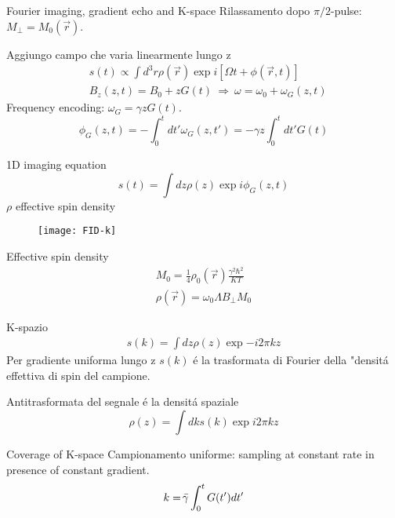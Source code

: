 \begin{frame}[allowframebreaks]{Fourier imaging, gradient echo and K-space}
Rilassamento dopo $\pi/2$-pulse:$M_{\perp}=M_0(\vec{r})$.
\begin{block}{Aggiungo campo che varia linearmente lungo z}
\begin{align*}
&s(t)\propto\int d^3 r\rho(\vec{r})\exp{i[\Omega t+\phi(\vec{r},t)]}\\
&B_z(z,t)=B_0+zG(t)\ \Rightarrow\ \omega=\omega_0+\omega_G(z,t)
\end{align*}
Frequency encoding: $\omega_G=\gamma zG(t)$.
\begin{equation*}
\phi_G(z,t)=-\int_0^td t'\omega_G(z,t')=-\gamma z\int_0^td t'G(t)
\end{equation*}
\end{block}
\begin{block}{1D imaging equation}
\begin{equation*}
s(t)=\int d z\rho(z)\exp{i\phi_G(z,t)}
\end{equation*}
$\rho$ effective spin density
\end{block}
\begin{figure}[!ht]\texttt{[image: FID-k]}\label{fig:FID-k}\end{figure}
\end{frame}

\begin{wordonframe}{Effective spin density}
\begin{align*}
M_0=\frac{1}{4}\rho_0(\vec{r})\frac{\gamma^2\hbar^2}{KT}\\
\rho(\vec{r})=\omega_0\Lambda B_{\perp}M_0
\end{align*}
\end{wordonframe} 

\begin{frame}{K-spazio}
\begin{align*}
s(k)=\int d z\rho(z)\exp{-i2\pi kz}
\end{align*}
Per gradiente uniforma lungo z $s(k)$ \'e la trasformata di Fourier della "densit\'a effettiva di spin del campione.
\begin{block}{Antitrasformata del segnale \'e la densit\'a spaziale}
\begin{equation*}
\rho(z)=\int d ks(k)\exp{i2\pi kz}
\end{equation*}
\end{block}
\begin{block}{Coverage of K-space}
Campionamento uniforme: sampling at constant rate in presence of constant gradient.
\begin{equation*}
k=\gammabar\int_0^tG(t')d t'
\end{equation*}
\end{block} 
\end{frame}

